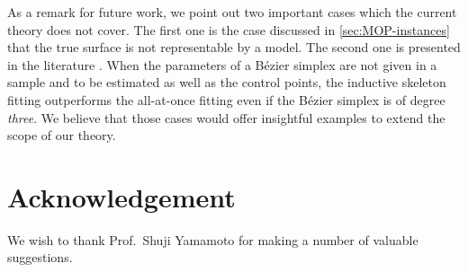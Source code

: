 \documentclass[letterpaper]{article} %
\theoremstyle{plain}
\begin{document}
As a remark for future work, we point out two important cases which the current theory does not cover.
The first one is the case discussed in \cref{sec:MOP-instances} that the true surface is not representable by a model.
The second one is presented in the literature \cite{Kobayashi2019}.
When the parameters of a B\'ezier simplex are not given in a sample and to be estimated as well as the control points, the inductive skeleton fitting outperforms the all-at-once fitting even if the B\'ezier simplex is of degree \emph{three}.
We believe that those cases would offer insightful examples to extend the scope of our theory.


\section*{Acknowledgement}
We wish to thank Prof.~Shuji Yamamoto for making a number of valuable suggestions.


\end{document}
